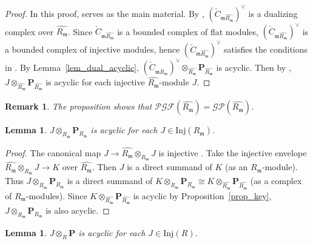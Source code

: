 \documentclass[11pt]{amsart}
\newtheorem{lemma}[theorem]{Lemma}
\newtheorem{remark}[theorem]{Remark}
\theoremstyle{remark}
\begin{document}
\begin{proof}
In this proof, \cite[\S~6]{murfet-salarian} serves as the main material. By \cite[(2.4.2)]{lipman}, $(\check C_{\mathfrak m \widehat{R_\mathfrak m}})^\vee$ is a dualizing complex over $\widehat{R_\mathfrak m}$. 
Since $\check C_{\mathfrak m \widehat{R_\mathfrak m}}$ is a bounded complex of flat modules, $(\check C_{\mathfrak m \widehat{R_\mathfrak m}})^\vee$ is a bounded complex of injective modules, hence $(\check C_{\mathfrak m \widehat{R_\mathfrak m}})^\vee$ satisfies the conditions in \cite[\S~6, Setup]{murfet-salarian}. By Lemma~\ref{lem_dual_acyclic}, $(\check C_{\mathfrak m \widehat{R_\mathfrak m}})^\vee \otimes_{\widehat{R_\mathfrak m}}\mathbf P_{\widehat{R_\mathfrak m}}$ is acyclic. 
Then by \cite[Proposition~6.1]{murfet-salarian}, $J\otimes_{\widehat{R_\mathfrak m}}\mathbf P_{\widehat{R_\mathfrak m}}$ is acyclic for each injective $\widehat{R_\mathfrak m}$-module $J$. 
\end{proof}

\begin{remark}
The proposition shows that $\mathcal{PGF}(\widehat{R_\mathfrak m})=\mathcal{GP}(\widehat{R_\mathfrak m})$. 
\end{remark}

\begin{lemma}\label{lem_PRm}
$J\otimes _{R_\mathfrak m} \mathbf P_{R_\mathfrak m}$ is acyclic for each $J \in \mathrm{Inj}(R_\mathfrak m)$.
\end{lemma}

\begin{proof}
The canonical map $J \to \widehat{R_\mathfrak m} \otimes _{R_\mathfrak m} J$ is injective \cite[Theorem~56]{Matsumura}. Take the injective envelope $\widehat{R_\mathfrak m} \otimes _{R_\mathfrak m} J \to K$ over $\widehat{R_\mathfrak m}$. Then $J$ is a direct summand of $K$ (as an $R_\mathfrak m$-module). Thus $J \otimes _{R_\mathfrak m} \mathbf P_{R_\mathfrak m}$ is a direct summand of $K \otimes _{R_\mathfrak m} \mathbf P_{R_\mathfrak m} \cong K \otimes _{\widehat {R_\mathfrak m}} \mathbf P_{\widehat{R_\mathfrak m}}$ (as a complex of $R_\mathfrak m$-modules). Since $K \otimes _{\widehat {R_\mathfrak m}} \mathbf P_{\widehat{R_\mathfrak m}}$ is acyclic by Proposition~\ref{prop_key}, $J \otimes _{R_\mathfrak m} \mathbf P_{R_\mathfrak m}$ is also acyclic.
\end{proof}

\begin{lemma}
$J \otimes_R \mathbf P$ is acyclic for each $J \in \mathrm{Inj}(R)$.
\end{lemma}
\end{document}

